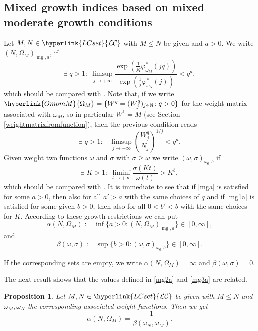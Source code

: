 \documentclass[10pt]{amsart}%
\numberwithin{equation}{section}
\theoremstyle{plain}
\newtheorem{proposition}{Proposition}[section]
\newcommand{\NN}{\mathbb{N}}
\let\on=\operatorname
\begin{document}
\subsection{Mixed growth indices based on mixed moderate growth conditions}\label{mixedmgindexsection}
Let $M,N\in\hyperlink{LCset}{\mathcal{LC}}$ with $M\le N$ be given and $a>0$. We write $(N,\Omega_M)_{\on{mg},a}$, if
\begin{equation}\label{mga}
\exists\;q>1:\;\limsup_{j\rightarrow+\infty}\frac{\exp(\frac{1}{jq}\varphi^{*}_{\omega_{M}}(jq))}{\exp(\frac{1}{j}\varphi^{*}_{\omega_{N}}(j))}<q^{a},
\end{equation}
which should be compared with \cite[Thm. 3.16 $(v)$]{index}. Note that, if we write $\hyperlink{OmomM}{\Omega_M}=\{W^q=(W_j^q)_{j\in\NN}\colon q>0\}$ for the weight matrix associated with $\omega_M$, so in particular $W^1=M$ (see Section \ref{weightmatrixfromfunction}), then the previous condition reads
$$
\exists\;q>1:\;\;\;\limsup_{j\rightarrow+\infty} \left(\frac{W_j^q}{N_j}\right)^{1/j} <q^{a}.
$$
Given weight two functions $\omega$ and $\sigma$ with $\sigma\ge\omega$ we write $(\omega,\sigma)_{\omega_6,b}$ if
\begin{equation}\label{mg1a}
\exists\;K>1:\;\liminf_{t\rightarrow+\infty}\frac{\sigma(Kt)}{\omega(t)}>K^b,
\end{equation}
which should be compared with \cite[Thm. 2.16 $(iii)$]{index}.
It is immediate to see that if \eqref{mga} is satisfied for some $a>0$, then also for all $a'>a$ with the same choices of $q$ and if \eqref{mg1a} is satisfied for some given $b>0$, then also for all $0<b'<b$ with the same choices for $K$. According to these growth restrictions we can put
\begin{equation}\label{mg2a}
\alpha(N,\Omega_M):=\inf\{a>0: (N,\Omega_M)_{\on{mg},a}\}\in [0,\infty],
\end{equation}
and
\begin{equation}\label{mg3a}
\beta(\omega,\sigma):=\sup\{b>0: (\omega,\sigma)_{\omega_6,b}\}\in [0,\infty].
\end{equation}

If the corresponding sets are empty, we write $\alpha(N,\Omega_M)=\infty$ and $\beta(\omega,\sigma)=0$.

The next result shows that the values defined in \eqref{mg2a} and \eqref{mg3a} are related.


\begin{proposition}\label{mgomega6comparison}
Let $M,N\in\hyperlink{LCset}{\mathcal{LC}}$ be given with $M\le N$ and $\omega_{M}, \omega_{N}$ the corresponding associated weight functions. Then we get
$$\alpha(N,\Omega_M)=\frac{1}{\beta(\omega_{N},\omega_{M})}.$$
\end{proposition}
\end{document}
